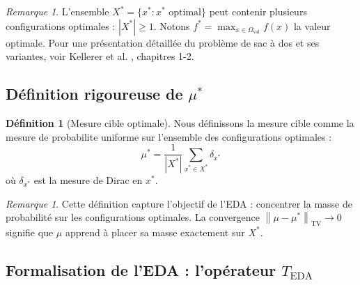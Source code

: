\documentclass[12pt,a4paper]{article}
\theoremstyle{definition}
\newtheorem{definition}[theorem]{Définition}
\theoremstyle{remark}
\newtheorem{remark}[theorem]{Remarque}
\newcommand{\TV}{\text{TV}}
\newcommand{\norm}[1]{\left\|#1\right\|}
\begin{document}
	\begin{remark}
		L'ensemble $X^* = \{x^* : x^* \text{ optimal}\}$ peut contenir plusieurs configurations optimales : $|X^*| \geq 1$. Notons $f^* = \max_{x\in\Omega_{\text{val}}} f(x)$ la valeur optimale. Pour une présentation détaillée du problème de sac à dos et ses variantes, voir Kellerer et al. \cite{kellerer2004knapsack}, chapitres 1-2.
	\end{remark}
	
	\subsection{Définition rigoureuse de $\mu^*$}
	
	\begin{definition}[Mesure cible optimale]
		Nous définissons la mesure cible comme la mesure de probabilite uniforme sur l'ensemble des configurations optimales :
		\begin{equation}
			\mu^* = \frac{1}{|X^*|} \sum_{x^*\in X^*} \delta_{x^*}
		\end{equation}
		où $\delta_{x^*}$ est la mesure de Dirac en $x^*$.
	\end{definition}
	
	\begin{remark}
		Cette définition capture l'objectif de l'EDA : concentrer la masse de probabilité sur les configurations optimales. La convergence $\norm{\mu - \mu^*}_{\TV} \to 0$ signifie que $\mu$ apprend à placer sa masse exactement sur $X^*$.
	\end{remark}
	
	\subsection{Formalisation de l'EDA : l'opérateur $T_{\text{EDA}}$}
	
\end{document}

